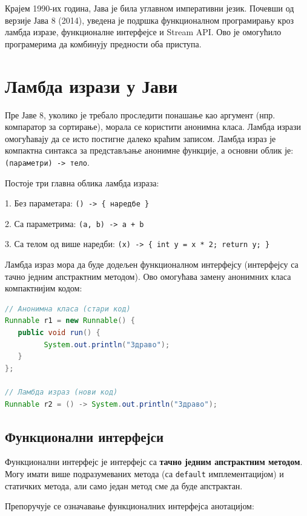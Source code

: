 Крајем 1990-их година, Јава је била углавном императивни језик. Почевши од верзије Јава 8 (2014), уведена је подршка функционалном програмирању кроз ламбда изразе, функционалне интерфејсе и Stream API. Ово је омогућило програмерима да комбинују предности оба приступа.


\section{Ламбда изрази у Јави}

Пре Јаве 8, уколико је требало проследити понашање као аргумент (нпр. компаратор за сортирање), морала се користити анонимна класа. Ламбда изрази омогућавају да се исто постигне далеко краћим записом. Ламбда израз је компактна синтакса за представљање анонимне функције, а основни облик је: \texttt{(параметри) -\textgreater{} тело}.

Постоје три главна облика ламбда израза:

1. Без параметара: \texttt{() -\textgreater{} \{ наредбе \}}

2. Са параметрима: \texttt{(a, b) -\textgreater{} a + b}

3. Са телом од више наредби:\textbf{ }\texttt{(x) -\textgreater{} \{ int y = x * 2; return y; \}}

Ламбда израз мора да буде додељен функционалном интерфејсу (интерфејсу са тачно једним апстрактним методом). Ово омогућава замену анонимних класа компактнијим кодом:

\begin{lstlisting}[language=Java]
// Анонимна класа (стари код)
Runnable r1 = new Runnable() {
   public void run() {
         System.out.println("Здраво");
   }
};
 
// Ламбда израз (нови код)
Runnable r2 = () -> System.out.println("Здраво");
\end{lstlisting}


\subsection{Функционални интерфејси}

Функционални интерфејс је интерфејс са \textbf{тачно једним апстрактним методом}. Могу имати више подразумеваних метода (са \texttt{default} имплементацијом) и статичких метода, али само један метод сме да буде апстрактан.

Препоручује се означавање функционалних интерфејса анотацијом:

